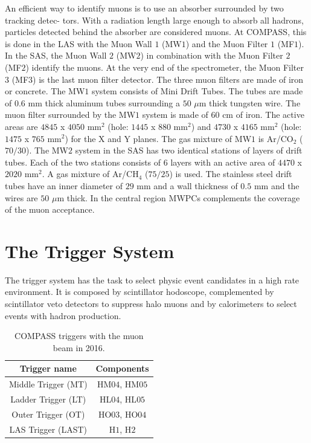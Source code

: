 An efficient way to identify muons is to use an absorber surrounded by two tracking detec- tors. With a radiation length large enough to absorb all hadrons, particles detected behind the absorber are considered muons. At COMPASS, this is done in the LAS with the Muon Wall $1$ (MW$1$) and the Muon Filter $1$ (MF$1$). In the SAS, the Muon Wall $2$ (MW$2$) in combination with the Muon Filter $2$ (MF$2$) identify the muons. At the very end of the spectrometer, the Muon Filter $3$ (MF$3$) is the last muon filter detector. The three muon filters are made of iron or concrete. The MW$1$ system consists of Mini Drift Tubes. The tubes are made of $0.6$ mm thick aluminum tubes surrounding a $50$ $\mu$m thick tungsten wire. The muon filter surrounded by the MW$1$ system is made of $60$ cm of iron. The active areas are $4845$ x $4050$ mm$^2$ (hole: $1445$ x $880$ mm$^2$) and $4730$ x $4165$ mm$^2$ (hole: $1475$ x $765$ mm$^2$) for the X and Y planes. The gas mixture of MW$1$ is Ar/CO$_2$ ($70/30$). The MW$2$ system in the SAS has two identical stations of layers of drift tubes. Each of the two stations consists of $6$ layers with an active area of $4470$ x $2020$ mm$^2$. A gas mixture of Ar/CH$_4$ ($75/25$) is used. The stainless steel drift tubes have an inner diameter of $29$ mm and a wall thickness of $0.5$ mm and the wires are $50$ $\mu$m thick. In the central region MWPCs complements the coverage of the muon acceptance.


\section{The Trigger System}\label{sec:trigger}

The trigger system \cite{TriggerSys} has the task to select physic event candidates in a high rate environment. It is composed by scintillator hodoscope, complemented by scintillator veto detectors to suppress halo muons and by calorimeters to select events with hadron production.

\begin{table}[!h]
  \caption{COMPASS triggers with the muon beam in 2016.}
  \label{tab:kinvar}
  \centering
  \begin{tabularx}{7.5cm}{cc}
    \hline
    \hline
    Trigger name & Components \\
    \hline
    \hline
    Middle Trigger (MT) & HM$04$, HM$05$ \\
    Ladder Trigger (LT) & HL$04$, HL$05$ \\
    Outer Trigger (OT) & HO$03$, HO$04$ \\
    LAS Trigger (LAST) & H$1$, H$2$ \\
    \hline
    \hline
  \end{tabularx}
\end{table}

